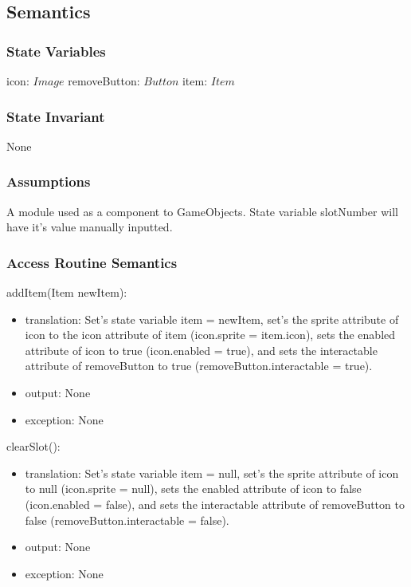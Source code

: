 \documentclass[12pt]{article}
\begin{document}
\subsection* {Semantics}

\subsubsection* {State Variables}

icon: $Image$
removeButton: $Button$
item: $Item$

\subsubsection* {State Invariant}

None

\subsubsection* {Assumptions}

A module used as a component to GameObjects. State variable slotNumber will have it's value manually inputted.

\subsubsection* {Access Routine Semantics}

\noindent addItem(Item newItem):
\begin{itemize}
\item translation: Set's state variable item = newItem, set's the sprite attribute of icon to the icon attribute of item (icon.sprite = item.icon), sets the enabled attribute of icon to true (icon.enabled = true), and sets the interactable attribute of removeButton to true (removeButton.interactable = true).
\item output: None
\item exception: None
\end{itemize}

\noindent clearSlot():
\begin{itemize}
\item translation: Set's state variable item = null, set's the sprite attribute of icon to null (icon.sprite = null), sets the enabled attribute of icon to false (icon.enabled = false), and sets the interactable attribute of removeButton to false (removeButton.interactable = false).
\item output: None
\item exception: None
\end{itemize}
\end{document}
